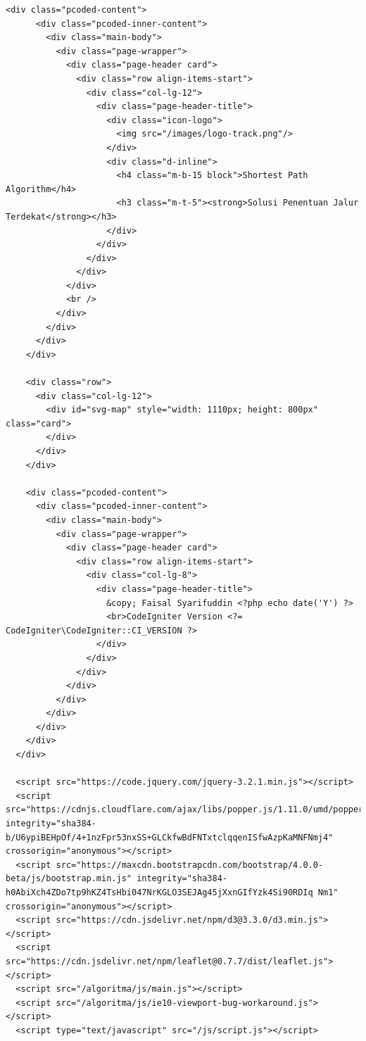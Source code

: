 \begin{enumerate}
\begin{lstlisting}[caption=Pemanggilan Library setView pada index.php]
    <div class="pcoded-content">
      <div class="pcoded-inner-content">
        <div class="main-body">
          <div class="page-wrapper">
            <div class="page-header card">
              <div class="row align-items-start">
                <div class="col-lg-12">
                  <div class="page-header-title">
                    <div class="icon-logo">
                      <img src="/images/logo-track.png"/>
                    </div>
                    <div class="d-inline">
                      <h4 class="m-b-15 block">Shortest Path Algorithm</h4>
                      <h3 class="m-t-5"><strong>Solusi Penentuan Jalur Terdekat</strong></h3>
                    </div>
                  </div>
                </div>
              </div>
            </div>
            <br />
          </div>
        </div>
      </div>
    </div>

    <div class="row">
      <div class="col-lg-12">
        <div id="svg-map" style="width: 1110px; height: 800px" class="card">
        </div>
      </div>
    </div>

    <div class="pcoded-content">
      <div class="pcoded-inner-content">
        <div class="main-body">
          <div class="page-wrapper">
            <div class="page-header card">
              <div class="row align-items-start">
                <div class="col-lg-8">
                  <div class="page-header-title">        
                    &copy; Faisal Syarifuddin <?php echo date('Y') ?>
                    <br>CodeIgniter Version <?= CodeIgniter\CodeIgniter::CI_VERSION ?>
                  </div>
                </div>
              </div>
            </div>
          </div>
        </div>
      </div>
    </div>
  </div>

  <script src="https://code.jquery.com/jquery-3.2.1.min.js"></script>
  <script src="https://cdnjs.cloudflare.com/ajax/libs/popper.js/1.11.0/umd/popper.min.js" integrity="sha384-b/U6ypiBEHpOf/4+1nzFpr53nxSS+GLCkfwBdFNTxtclqqenISfwAzpKaMNFNmj4" crossorigin="anonymous"></script>
  <script src="https://maxcdn.bootstrapcdn.com/bootstrap/4.0.0-beta/js/bootstrap.min.js" integrity="sha384-h0AbiXch4ZDo7tp9hKZ4TsHbi047NrKGLO3SEJAg45jXxnGIfYzk4Si90RDIq Nm1" crossorigin="anonymous"></script>
  <script src="https://cdn.jsdelivr.net/npm/d3@3.3.0/d3.min.js"></script>
  <script src="https://cdn.jsdelivr.net/npm/leaflet@0.7.7/dist/leaflet.js"></script>
  <script src="/algoritma/js/main.js"></script>
  <script src="/algoritma/js/ie10-viewport-bug-workaround.js"></script>
  <script type="text/javascript" src="/js/script.js"></script>


\end{lstlisting}
\end{enumerate}
